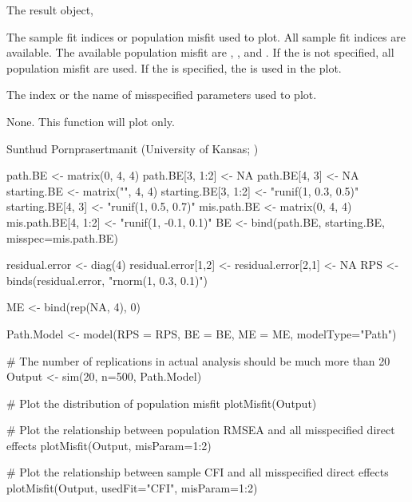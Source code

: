 \documentclass[a4paper]{book}
\begin{document}
\begin{Arguments}
\begin{ldescription}
\item[\code{object}] 
The result object, 

\item[\code{usedFit}] 
The sample fit indices or population misfit used to plot. All sample fit indices are available. The available population misfit are , , and . If the  is not specified, all population misfit are used. If the  is specified, the  is used in the plot.

\item[\code{misParam}] 
The index or the name of misspecified parameters used to plot.

\end{ldescription}
\end{Arguments}
%
\begin{Value}
None. This function will plot only.
\end{Value}
%
\begin{Author}\relax
Sunthud Pornprasertmanit (University of Kansas; )
\end{Author}
%
\begin{Examples}
\begin{ExampleCode}
path.BE <- matrix(0, 4, 4)
path.BE[3, 1:2] <- NA
path.BE[4, 3] <- NA
starting.BE <- matrix("", 4, 4)
starting.BE[3, 1:2] <- "runif(1, 0.3, 0.5)"
starting.BE[4, 3] <- "runif(1, 0.5, 0.7)"
mis.path.BE <- matrix(0, 4, 4)
mis.path.BE[4, 1:2] <- "runif(1, -0.1, 0.1)"
BE <- bind(path.BE, starting.BE, misspec=mis.path.BE)

residual.error <- diag(4)
residual.error[1,2] <- residual.error[2,1] <- NA
RPS <- binds(residual.error, "rnorm(1, 0.3, 0.1)")

ME <- bind(rep(NA, 4), 0)

Path.Model <- model(RPS = RPS, BE = BE, ME = ME, modelType="Path")

# The number of replications in actual analysis should be much more than 20
Output <- sim(20, n=500, Path.Model)

# Plot the distribution of population misfit
plotMisfit(Output)

# Plot the relationship between population RMSEA and all misspecified direct effects
plotMisfit(Output, misParam=1:2)

# Plot the relationship between sample CFI and all misspecified direct effects 
plotMisfit(Output, usedFit="CFI", misParam=1:2)
\end{ExampleCode}
\end{Examples}
\end{document}
